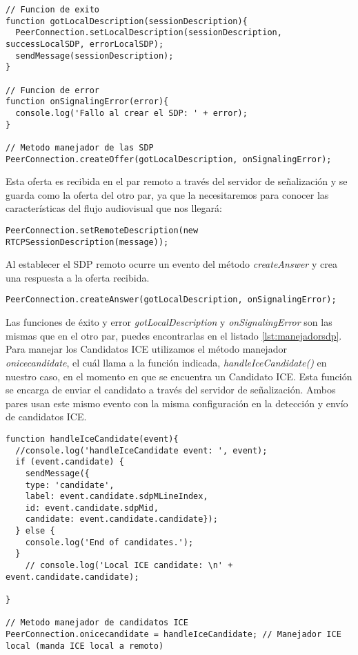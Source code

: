 \begin{lstlisting}[caption={Manejador de los SDP.}, label={lst:manejadorsdp}]
// Funcion de exito
function gotLocalDescription(sessionDescription){
  PeerConnection.setLocalDescription(sessionDescription, successLocalSDP, errorLocalSDP);
  sendMessage(sessionDescription);
}

// Funcion de error
function onSignalingError(error){
  console.log('Fallo al crear el SDP: ' + error);	
}

// Metodo manejador de las SDP
PeerConnection.createOffer(gotLocalDescription, onSignalingError);
\end{lstlisting}

Esta oferta es recibida en el par remoto a través del servidor de señalización y se guarda como la oferta del otro par, ya que la necesitaremos para conocer las características del flujo audiovisual que nos llegará:\\


\begin{lstlisting}[caption={Estableciendo SDP del par remoto.}]
PeerConnection.setRemoteDescription(new RTCPSessionDescription(message));
\end{lstlisting}

Al establecer el SDP remoto ocurre un evento del método \emph{createAnswer} y crea una respuesta a la oferta recibida.\\

\begin{lstlisting}[caption=Manejador de respuestas SDP]
PeerConnection.createAnswer(gotLocalDescription, onSignalingError);
\end{lstlisting}


Las funciones de éxito y error \emph{gotLocalDescription} y \emph{onSignalingError} son las mismas que en el otro par, puedes encontrarlas en el listado \ref{lst:manejadorsdp}.\\

Para manejar los Candidatos ICE utilizamos el método manejador \emph{onicecandidate}, el cuál llama a la función indicada, \emph{handleIceCandidate()} en nuestro caso, en el momento en que se encuentra un Candidato ICE. Esta función se encarga de enviar el candidato a través del servidor de señalización. Ambos pares usan este mismo evento con la misma configuración en la detección y envío de candidatos ICE.\\

\begin{lstlisting}[caption=Manejador de los Candidatos ICE locales.]
function handleIceCandidate(event){
  //console.log('handleIceCandidate event: ', event);
  if (event.candidate) {
    sendMessage({
    type: 'candidate',
    label: event.candidate.sdpMLineIndex,
    id: event.candidate.sdpMid,
    candidate: event.candidate.candidate});
  } else {
    console.log('End of candidates.');
  }
    // console.log('Local ICE candidate: \n' + event.candidate.candidate);
  
}

// Metodo manejador de candidatos ICE
PeerConnection.onicecandidate = handleIceCandidate; // Manejador ICE local (manda ICE local a remoto)
\end{lstlisting}

